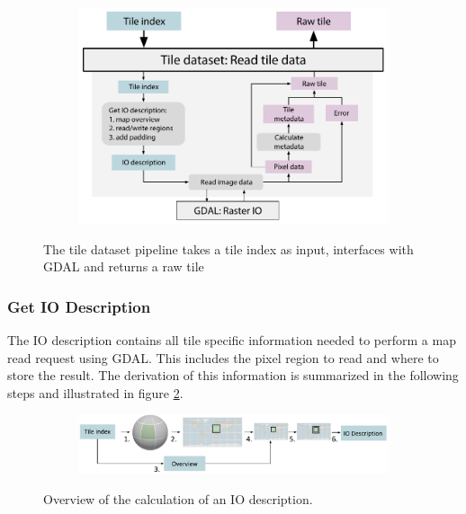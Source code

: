 \begin{figure}[htbp]
    \centering
    \begin{subfigure}[bt]{0.8\textwidth}
        \includegraphics[width=\textwidth]{figures/implementation/pipeline/tiledataset.pdf}
    \end{subfigure}
    \caption{The tile dataset pipeline takes a tile index as input, interfaces with GDAL and returns a raw tile}
    \label{fig:tiledataset}
\end{figure}

\subsubsection{Get IO Description}
The IO description contains all tile specific information needed to perform a map read request using GDAL. This includes the pixel region to read and where to store the result. The derivation of this information is summarized in the following steps and illustrated in figure \ref{fig:getiodescription}.

\begin{figure}[htbp]
    \centering
    \begin{subfigure}[bt]{0.9\textwidth}
        \includegraphics[width=\textwidth]{figures/implementation/pipeline/getiodescription.pdf}
    \end{subfigure}
    \caption{Overview of the calculation of an IO description.}
    \label{fig:getiodescription}
\end{figure}

